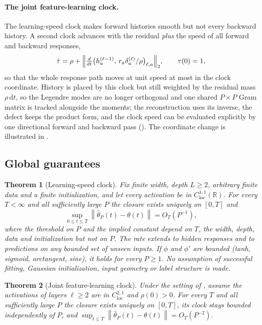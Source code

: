 \documentclass[11pt]{article}
\newtheorem{theorem}{Theorem}[section]
\theoremstyle{definition}
\theoremstyle{remark}
\newcommand{\R}{\mathbb{R}}
\newcommand{\norm}[1]{\left\lVert #1\right\rVert}
\newcommand{\dd}{\,\mathrm{d}}
\begin{document}
\paragraph{The joint feature-learning clock.}
The learning-speed clock makes forward histories smooth but not every backward
history.  A second clock advances with the residual \emph{plus} the speed of all
forward and backward responses,
\begin{equation}
 \dot\tau=\rho+\Bigl\|\tfrac{d}{dt}\bigl(h_a^{(\ell-1)},\,r_a\delta_a^{(\ell)}/\rho\bigr)_{\ell,a}\Bigr\|_2,
 \qquad\tau(0)=1,                                         \label{eq:new-clock}
\end{equation}
so that the whole response path moves at unit speed at most in the clock
coordinate.  History is placed by this clock but still weighted by the residual
mass $\rho\dd t$, so the Legendre modes are no longer orthogonal and one shared
$P\times P$ Gram matrix is tracked alongside the moments; the reconstruction uses
its inverse, the defect keeps the product form, and the clock speed can be
evaluated explicitly by one directional forward and backward pass
().
The coordinate change is illustrated in .

\subsection{Global guarantees}

\begin{theorem}[Learning-speed clock]
\label{thm:old}
Fix finite width, depth $L\ge2$, arbitrary finite data and a finite
initialization, and let every activation be in $C^{1,1}_{\mathrm{loc}}(\R)$.  For
every $T<\infty$ and all sufficiently large $P$ the closure exists uniquely on
$[0,T]$ and
\[
 \sup_{0\le t\le T}\norm{\widehat\theta_P(t)-\theta(t)}=O_T(P^{-1}),
\]
where the threshold on $P$ and the implied constant depend on $T$, the width,
depth, data and initialization but not on $P$.
The rate extends to hidden responses and to predictions on any bounded set of
unseen inputs.  If $\phi$ and $\phi'$ are bounded (tanh, sigmoid, arctangent,
sine), it holds for every $P\ge1$.  No assumption of successful fitting, Gaussian
initialization, input geometry or label structure is made.
\end{theorem}

\begin{theorem}[Joint feature-learning clock]
\label{thm:new}
Under the setting of , assume the activations of layers $\ell\ge2$
are in $C^{2,1}_{\mathrm{loc}}$ and $\rho(0)>0$.  For every $T$ and all
sufficiently large $P$ the closure exists uniquely on $[0,T]$, its clock stays
bounded independently of $P$, and
$\sup_{t\le T}\norm{\widehat\theta_P(t)-\theta(t)}=O_T(P^{-2})$.
\end{theorem}
\end{document}

